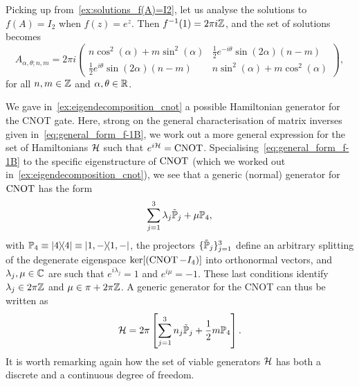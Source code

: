 \begin{example}
\label{ex:solutions_e^A=I2}
Picking up from~\cref{ex:solutions_f(A)=I2}, let us analyse the solutions to $f(A)=I_2$ when $f(z)=e^z$.
Then $f^{-1}(1)=2\pi i\mathbb{Z}$, and the set of solutions becomes
\begin{equation}
    A_{\alpha,\theta;n,m} = 2\pi i
    \begin{pmatrix}
        n \cos^2(\alpha)+m\sin^2(\alpha) &
        \frac12 e^{-i\theta} \sin(2\alpha) (n-m) \\ 
        \frac12 e^{i\theta} \sin(2\alpha) (n-m) &
        n \sin^2(\alpha)+m\cos^2(\alpha)
    \end{pmatrix},
\end{equation}
for all $n,m\in\mathbb{Z}$ and $\alpha,\theta\in\mathbb{R}$.
\end{example}

\begin{example}
We gave in~\cref{ex:eigendecomposition_cnot} a possible Hamiltonian generator for the CNOT gate.
Here, strong on the general characterisation of matrix inverses given in~\cref{eq:general_form_f-1B}, we work out a more general expression for the set of Hamiltonians $\mathcal{H}$ such that $e^{i\mathcal{H}}=\operatorname{CNOT}$.
Specialising~\cref{eq:general_form_f-1B} to the specific eigenstructure of $\operatorname{CNOT}$ (which we worked out in~\cref{ex:eigendecomposition_cnot}), we see that a generic (normal) generator for $\operatorname{CNOT}$ has the form
\begin{equation}
    \sum_{j=1}^3 \lambda_j \tilde{\mathbb{P}}_j + \mu\mathbb{P}_4,
\end{equation}
with
$\mathbb{P}_4\equiv\ketbra 4\equiv\ketbra{1,-}$, the projectors 
$\{\tilde{\mathbb{P}}_j\}_{j=1}^3$ define an arbitrary splitting of the degenerate eigenspace $\ker[(\operatorname{CNOT}-I_4)]$ into orthonormal vectors, and $\lambda_j,\mu\in\mathbb{C}$ are such that $e^{i\lambda_j}=1$ and $e^{i\mu}=-1$.
These last conditions identify $\lambda_j\in2\pi\mathbb{Z}$ and $\mu\in\pi + 2\pi\mathbb{Z}$.
A generic generator for the CNOT can thus be written as
\begin{equation}
    \mathcal{H} =
    2\pi\left[
    \sum_{j=1}^3 n_j \tilde{\mathbb{P}}_j +
    \frac{1}{2} m\mathbb{P}_4
    \right].
\end{equation}
It is worth remarking again how the set of viable generators $\mathcal{H}$ has both a discrete and a continuous degree of freedom.
\end{example}

